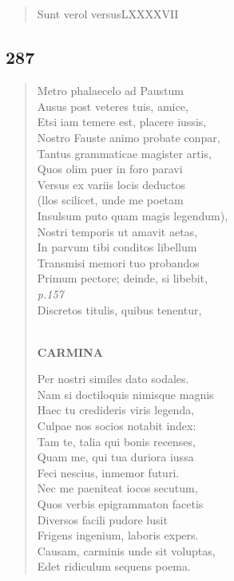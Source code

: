 \documentclass[11pt, a4paper]{report}
\begin{document}
            \subsection*{}
      \begin{verse}
      Sunt  \lbrack verol versusLXXXXVII \\ 
      \end{verse}
  
            \subsection*{287}
      \begin{verse}
      Metro phalaecelo ad Paustum \\ Ausus post veteres tuis, amice, \\ Etsi iam temere est, placere iussis, \\ Nostro Fauste animo probate conpar, \\ Tantus grammaticae magister artis, \\ Quos olim puer in foro paravi \\ Versus ex variis locis deductos \\ (llos scilicet, unde me poetam \\ Insulsum puto quam magis legendum), \\ Nostri temporis ut amavit aetas, \\ In parvum tibi conditos libellum \\ Transmisi memori tuo probandos \\ Primum pectore; deinde, si libebit, \\ \textit{p.157} \\ Discretos titulis, quibus tenentur, \\ 
        ﻿\pagebreak 
    \begin{center} \textbf{CARMINA} \end{center} \marginpar{[248]} Per nostri similes dato sodales. \\ Nam si doctiloquis nimisque magnis \\ Haec tu credideris viris legenda, \\ Culpae nos socios notabit index: \\ Tam te, talia qui bonis recenses, \\ Quam me, qui tua duriora iussa \\ Feci nescius, inmemor futuri. \\ Nec me paeniteat iocos secutum, \\ Quos verbis epigrammaton facetis \\ Diversos facili pudore lusit \\ Frigens ingenium, laboris expers. \\ Causam, carminis unde sit voluptas, \\ Edet ridiculum sequens poema. \\ 
      \end{verse}
  
\end{document}
